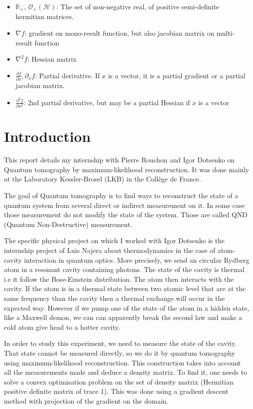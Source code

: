 \documentclass[10pt]{report}
\theoremstyle{plain}
\theoremstyle{definition}
\theoremstyle{remark}
\newcommand{\R}{\ensuremath{\mathbb{R}}}
\newcommand{\dpar}[2]{\frac{\partial{#1}}{\partial{#2}}}
\newcommand{\dparn}[3]{\frac{\partial^{#3} {#1}}{\partial{#2}^{#3}}}
\begin{document}
\begin{itemize}
  \item $\R_+$, $\mathcal{O}_+(\mathcal{H})$: The set of non-negative real, of
    positive semi-definite hermitian matrices.
  \item $\nabla f$: gradient on mono-result function, but also jacobian matrix
    on multi-result function
  \item $\nabla^2 f$: Hessian matrix
  \item $\dpar f x, \partial_x f$: Partial derivative. If $x$ is a vector, it is
    a partial gradient or a partial jacobian matrix.
  \item $\dparn f x 2$: 2nd partial derivative, but may be a partial Hessian if
    $x$ is a vector
\end{itemize}



\chapter*{Introduction}

This report details my internship with Pierre Rouchon and Igor Dotsenko on
Quantum tomography by maximum-likelihood reconstruction. It was done mainly at
the Laboratory Kessler-Brosel (LKB) in the Collège de France.

The goal of Quantum tomography is to find ways to reconstruct the state of
a quantum system from several direct or indirect measurement on it. In some case
those measurement do not modify the state of the system. Those are called QND
(Quantum Non-Destructive) measurement.

The specific physical project on which I worked with Igor Dotsenko is the
internship project of Luis Najera about thermodynamics in the case of
atom-cavity interaction in quantum optics. More precisely, we send an circular
Rydberg atom in a resonant cavity containing photons. The state of the cavity is
thermal i.e it follow the Bose-Einstein distribution. The atom then interacts
with the cavity. If the atom is in a thermal state between two atomic level that
are at the same frequency than the cavity then a thermal exchange will occur in
the expected way. However if we pump one of the state of the atom in a hidden
state, like a Maxwell demon, we can can apparently break the second law and make
a cold atom give head to a hotter cavity.

In order to study this experiment, we need to measure the state of the cavity.
That state cannot be measured directly, so we do it by quantum tomography using
maximum-likelihood reconstruction. This construction takes into account all the
measurements made and deduce a density matrix. To find it, one needs to solve a
convex optimisation problem on the set of density matrix (Hermitian positive
definite matrix of trace 1). This was done using a gradient descent method with
projection of the gradient on the domain.
\end{document}

